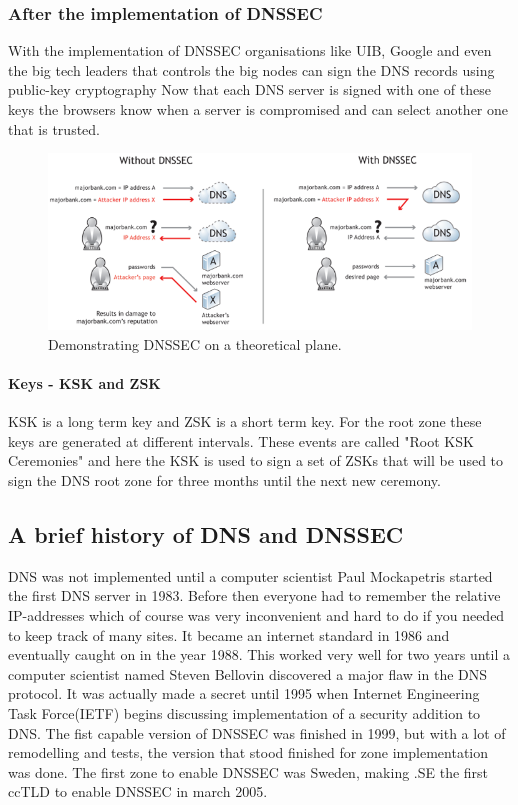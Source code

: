 \documentclass{article}
\begin{document}
	        \subsubsection{After the implementation of DNSSEC}
	        With the implementation of DNSSEC organisations like UIB, Google and even the big tech leaders that controls the big nodes can sign the DNS records using public-key cryptography\cite{icann}
	        Now that each DNS server is signed with one of these keys the browsers know when a server is compromised and can select another one that is trusted.\\
	        \begin{figure}[ht]
	        	\centering
	        	\includegraphics[width=1.0\textwidth]{dnsVsDnssec}
	        	\caption{Demonstrating DNSSEC on a theoretical plane.\cite{IcannDnssec}}
	        	\label{normal_case}
	        \end{figure}
				\paragraph{Keys - KSK and ZSK}
				KSK is a long term key and ZSK is a short term key. For the root zone these keys are generated at different intervals. These events are called "Root KSK Ceremonies" and here the KSK is used to sign a set of ZSKs that will be used to sign the DNS root zone for three months until the next new ceremony. \cite{iana}
		\subsection{A brief history of DNS and DNSSEC}  
		DNS was not implemented until a computer scientist Paul Mockapetris started the first DNS server in 1983. Before then everyone had to remember the relative IP-addresses which of course was very inconvenient and hard to do if you needed to keep track of many sites.
		It became an internet standard in 1986 and eventually caught on in the year 1988.
		This worked very well for two years until a computer scientist named Steven Bellovin discovered a major flaw in the DNS protocol. It was actually made a secret until 1995 when Internet Engineering Task Force(IETF) begins discussing implementation of a security addition to DNS.
		The fist capable version of DNSSEC was finished in 1999, but with a lot of remodelling and tests, the version that stood finished for zone implementation was done.
		The first zone to enable DNSSEC was Sweden, making .SE the first ccTLD to enable DNSSEC in march 2005.\cite{NLnetLabs}
\end{document}
